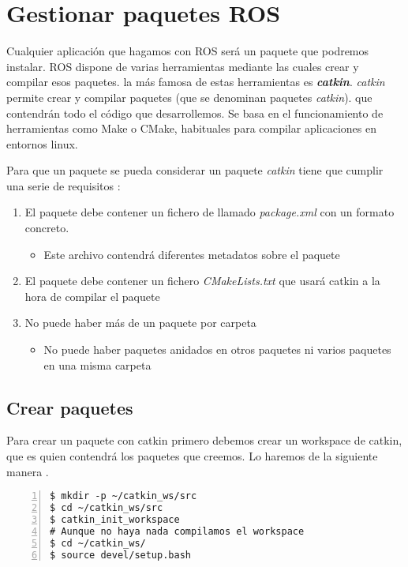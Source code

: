 	\section{Gestionar paquetes ROS}
	Cualquier aplicación que hagamos con ROS será un paquete que podremos instalar. ROS dispone de varias herramientas mediante las cuales crear y compilar esos paquetes. la más famosa de estas herramientas es \emph{\textbf{catkin}}. \emph{catkin} permite crear y compilar paquetes (que se denominan paquetes \emph{catkin}). que contendrán todo el código que desarrollemos. Se basa en el funcionamiento de herramientas como Make o CMake, habituales para compilar aplicaciones en entornos linux.
	
	Para que un paquete se pueda considerar un paquete \emph{catkin} tiene que cumplir una serie de requisitos \cite{ros-catkin-create}:
	
	\begin{enumerate}
		\item El paquete debe contener un fichero de llamado \textit{package.xml} con un formato concreto.
		\begin{itemize}
			\item Este archivo contendrá diferentes metadatos sobre el paquete
		\end{itemize}
		\item El paquete debe contener un fichero \textit{CMakeLists.txt} que usará catkin a la hora de compilar el paquete
		\item No puede haber más de un paquete por carpeta
		\begin{itemize}
			\item No puede haber paquetes anidados en otros paquetes ni varios paquetes en una misma carpeta
		\end{itemize}
	\end{enumerate}
	
		\subsection{Crear paquetes}
		Para crear un paquete con catkin primero debemos crear un workspace de catkin, que es quien contendrá los paquetes que creemos. Lo haremos de la siguiente manera \cite{ros-catkin-workspace}.
		
		\begin{lstlisting}[style=consola,numbers=left]
$ mkdir -p ~/catkin_ws/src
$ cd ~/catkin_ws/src
$ catkin_init_workspace
# Aunque no haya nada compilamos el workspace
$ cd ~/catkin_ws/
$ source devel/setup.bash
		\end{lstlisting}
		
